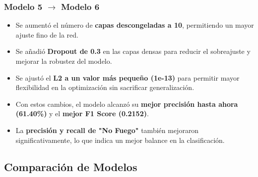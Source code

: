 \subsubsection{Modelo 5 $\rightarrow$ Modelo 6}
\begin{itemize}
    \item Se aumentó el número de \textbf{capas descongeladas a 10}, permitiendo un mayor ajuste fino de la red.
    \item Se añadió \textbf{Dropout de 0.3} en las capas densas para reducir el sobreajuste y mejorar la robustez del modelo.
    \item Se ajustó el \textbf{L2 a un valor más pequeño (1e-13)} para permitir mayor flexibilidad en la optimización sin sacrificar generalización.
    \item Con estos cambios, el modelo alcanzó su \textbf{mejor precisión hasta ahora (61.40\%)} y el \textbf{mejor F1 Score (0.2152)}.
    \item La \textbf{precisión y recall de "No Fuego"} también mejoraron significativamente, lo que indica un mejor balance en la clasificación.
\end{itemize}

\subsection{Comparación de Modelos}

\begin{table}[h]
    \centering
    \renewcommand{\arraystretch}{1.3}
    \caption{Comparación de métricas de evaluación entre diferentes modelos entrenados.}
    \label{tab:evaluation_metrics}
\end{table}

